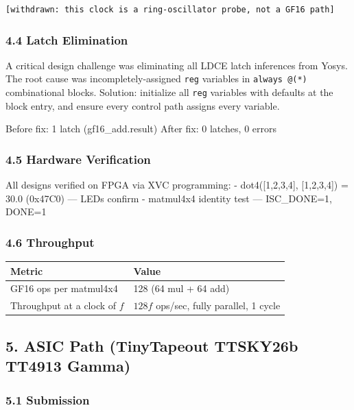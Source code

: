 \documentclass[
]{article}
\newcounter{none} %
\begin{document}
\begin{verbatim}
[withdrawn: this clock is a ring-oscillator probe, not a GF16 path]
\end{verbatim}

\subsubsection{4.4 Latch Elimination}\label{latch-elimination}

A critical design challenge was eliminating all LDCE latch inferences
from Yosys. The root cause was incompletely-assigned \texttt{reg}
variables in \texttt{always\ @(*)} combinational blocks. Solution:
initialize all \texttt{reg} variables with defaults at the block entry,
and ensure every control path assigns every variable.

Before fix: 1 latch (gf16\_add.result) After fix: 0 latches, 0 errors

\subsubsection{4.5 Hardware Verification}\label{hardware-verification}

All designs verified on FPGA via XVC programming: - dot4({[}1,2,3,4{]},
{[}1,2,3,4{]}) = 30.0 (0x47C0) --- LEDs confirm - matmul4x4 identity
test --- ISC\_DONE=1, DONE=1

\subsubsection{4.6 Throughput}\label{throughput}

{\def\LTcaptype{none} %
\begin{longtable}[]{@{}ll@{}}
\toprule\noalign{}
Metric & Value \\
\midrule\noalign{}
\endhead
\bottomrule\noalign{}
\endlastfoot
GF16 ops per matmul4x4 & 128 (64 mul + 64 add) \\
Throughput at a clock of $f$ & $128f$ ops/sec, fully parallel, 1 cycle \\
\end{longtable}
}

\subsection{5. ASIC Path (TinyTapeout
TTSKY26b TT4913 Gamma)}\label{asic-path-tinytapeout-ttsky26b}

\subsubsection{5.1 Submission}\label{submission}
\end{document}
